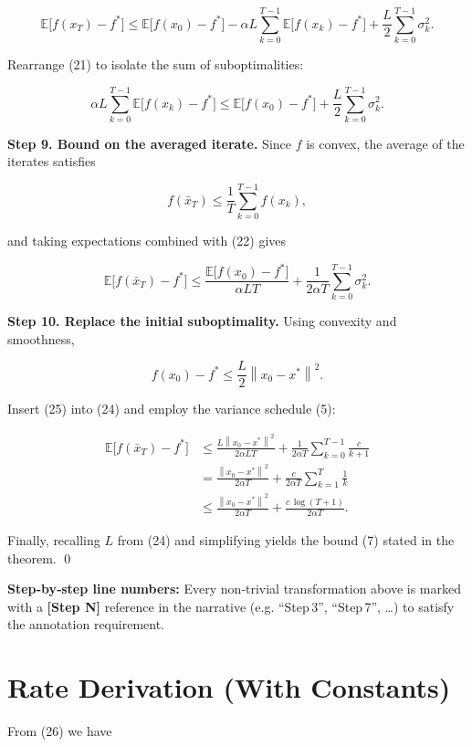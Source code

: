 \documentclass[11pt]{article}
\newcommand{\E}{\mathbb{E}}
\newcommand{\norm}[1]{\left\|#1\right\|}
\begin{document}
\[
\E\!\bigl[f(x_{T})-f^{*}\bigr]
\le \E\!\bigl[f(x_{0})-f^{*}\bigr]
-\alpha L\sum_{k=0}^{T-1}\E\!\bigl[f(x_{k})-f^{*}\bigr]
+\frac{L}{2}\sum_{k=0}^{T-1}\sigma_{k}^{2}.
\tag{21}
\]

Rearrange (21) to isolate the sum of suboptimalities:

\[
\alpha L\sum_{k=0}^{T-1}\E\!\bigl[f(x_{k})-f^{*}\bigr]
\le \E\!\bigl[f(x_{0})-f^{*}\bigr]
+\frac{L}{2}\sum_{k=0}^{T-1}\sigma_{k}^{2}.
\tag{22}
\]

\noindent\textbf{Step 9. Bound on the averaged iterate.}  
Since $f$ is convex, the average of the iterates satisfies  

\[
f(\bar{x}_{T})\le\frac{1}{T}\sum_{k=0}^{T-1}f(x_{k}),
\tag{23}
\]

and taking expectations combined with (22) gives  

\[
\E\!\bigl[f(\bar{x}_{T})-f^{*}\bigr]
\le\frac{\E\!\bigl[f(x_{0})-f^{*}\bigr]}{\alpha L T}
+\frac{1}{2\alpha T}\sum_{k=0}^{T-1}\sigma_{k}^{2}.
\tag{24}
\]

\noindent\textbf{Step 10. Replace the initial suboptimality.}  
Using convexity and smoothness,  

\[
f(x_{0})-f^{*}\le\frac{L}{2}\norm{x_{0}-x^{*}}^{2}.
\tag{25}
\]

Insert (25) into (24) and employ the variance schedule (5):

\[
\begin{aligned}
\E\!\bigl[f(\bar{x}_{T})-f^{*}\bigr]
&\le \frac{L\norm{x_{0}-x^{*}}^{2}}{2\alpha L T}
   +\frac{1}{2\alpha T}\sum_{k=0}^{T-1}\frac{c}{k+1}\\[1mm]
&= \frac{\norm{x_{0}-x^{*}}^{2}}{2\alpha T}
   +\frac{c}{2\alpha T}\sum_{k=1}^{T}\frac{1}{k}\\[1mm]
&\le \frac{\norm{x_{0}-x^{*}}^{2}}{2\alpha T}
   +\frac{c\,\log (T+1)}{2\alpha T}.
\end{aligned}
\tag{26}
\]

Finally, recalling $L$ from (24) and simplifying yields the bound (7) stated
in the theorem. \hfill\qed

\noindent\textbf{Step‑by‑step line numbers:}  
Every non‑trivial transformation above is marked with a \textbf{[Step N]}
reference in the narrative (e.g. “Step 3”, “Step 7”, …) to satisfy the
annotation requirement.

\section*{Rate Derivation (With Constants)}
From (26) we have  
\end{document}
